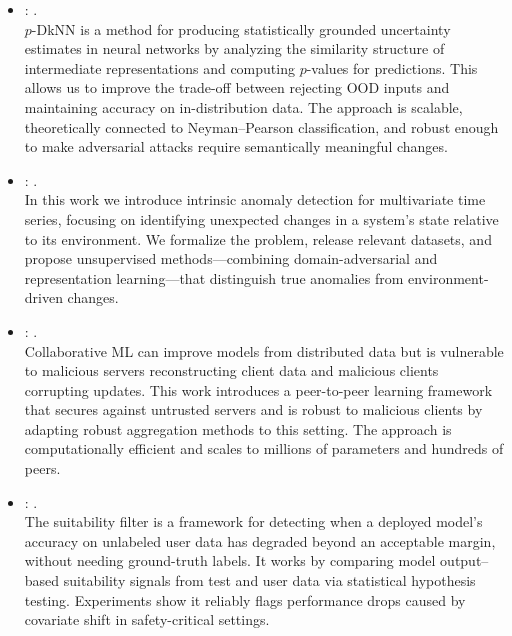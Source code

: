 \begin{itemize}
    \item \citet{dziedzic2022p}: .\\[10pt]

    $p$-DkNN is a method for producing statistically grounded uncertainty estimates in neural networks by analyzing the similarity structure of intermediate representations and computing $p$-values for predictions. This allows us to improve the trade-off between rejecting OOD inputs and maintaining accuracy on in-distribution data. The approach is scalable, theoretically connected to Neyman–Pearson classification, and robust enough to make adversarial attacks require semantically meaningful changes.
    
    \item \citet{rabanser2022intrinsic}: .\\[10pt]
    In this work we introduce intrinsic anomaly detection for multivariate time series, focusing on identifying unexpected changes in a system’s state relative to its environment. We formalize the problem, release relevant datasets, and propose unsupervised methods—combining domain-adversarial and representation learning—that distinguish true anomalies from environment-driven changes.
    
    \item \citet{franzese2023robust}: .\\[10pt]
    Collaborative ML can improve models from distributed data but is vulnerable to malicious servers reconstructing client data and malicious clients corrupting updates. This work introduces a peer-to-peer learning framework that secures against untrusted servers and is robust to malicious clients by adapting robust aggregation methods to this setting. The approach is computationally efficient and scales to millions of parameters and hundreds of peers.
    
    
    \item \citet{pouget2025suitability}: .\\[10pt]
    The suitability filter is a framework for detecting when a deployed model’s accuracy on unlabeled user data has degraded beyond an acceptable margin, without needing ground-truth labels. It works by comparing model output–based suitability signals from test and user data via statistical hypothesis testing. Experiments show it reliably flags performance drops caused by covariate shift in safety-critical settings.
    

\end{itemize}
